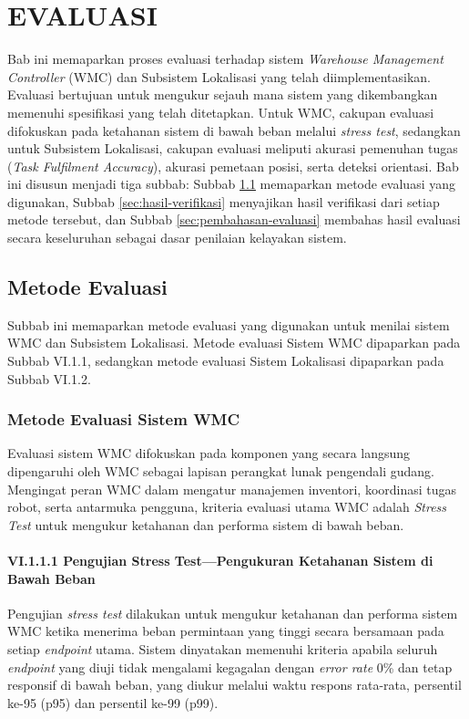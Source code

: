 \cleardoublepage
\chapter{EVALUASI}
\label{chap:evaluasi}
Bab ini memaparkan proses evaluasi terhadap sistem \textit{Warehouse Management Controller} (WMC) dan Subsistem Lokalisasi yang telah diimplementasikan. Evaluasi bertujuan untuk mengukur sejauh mana sistem yang dikembangkan memenuhi spesifikasi yang telah ditetapkan. Untuk WMC, cakupan evaluasi difokuskan pada ketahanan sistem di bawah beban melalui \textit{stress test}, sedangkan untuk Subsistem Lokalisasi, cakupan evaluasi meliputi akurasi pemenuhan tugas (\textit{Task Fulfilment Accuracy}), akurasi pemetaan posisi, serta deteksi orientasi. Bab ini disusun menjadi tiga subbab: Subbab \ref{sec:metode-evaluasi} memaparkan metode evaluasi yang digunakan, Subbab \ref{sec:hasil-verifikasi} menyajikan hasil verifikasi dari setiap metode tersebut, dan Subbab \ref{sec:pembahasan-evaluasi} membahas hasil evaluasi secara keseluruhan sebagai dasar penilaian kelayakan sistem.

\section{Metode Evaluasi}
\label{sec:metode-evaluasi}
Subbab ini memaparkan metode evaluasi yang digunakan untuk menilai sistem WMC dan Subsistem Lokalisasi. Metode evaluasi Sistem WMC dipaparkan pada Subbab VI.1.1, sedangkan metode evaluasi Sistem Lokalisasi dipaparkan pada Subbab VI.1.2.

\subsection{Metode Evaluasi Sistem WMC}
Evaluasi sistem WMC difokuskan pada komponen yang secara langsung dipengaruhi oleh WMC sebagai lapisan perangkat lunak pengendali gudang. Mengingat peran WMC dalam mengatur manajemen inventori, koordinasi tugas robot, serta antarmuka pengguna, kriteria evaluasi utama WMC adalah \textit{Stress Test} untuk mengukur ketahanan dan performa sistem di bawah beban.

\subsubsection*{VI.1.1.1 Pengujian Stress Test---Pengukuran Ketahanan Sistem di Bawah Beban}
Pengujian \textit{stress test} dilakukan untuk mengukur ketahanan dan performa sistem WMC ketika menerima beban permintaan yang tinggi secara bersamaan pada setiap \textit{endpoint} utama. Sistem dinyatakan memenuhi kriteria apabila seluruh \textit{endpoint} yang diuji tidak mengalami kegagalan dengan \textit{error rate} 0\% dan tetap responsif di bawah beban, yang diukur melalui waktu respons rata-rata, persentil ke-95 (p95) dan persentil ke-99 (p99).

